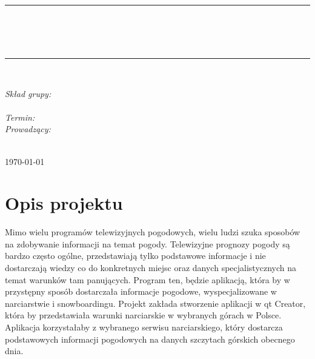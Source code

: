 \documentclass[10pt, a4paper]{article}
\begin{document}
\def\tablename{Tabela}	

\begin{titlepage}
	\begin{center}
		\textsc{\LARGE \formakursu}\\[1cm]		
		\textsc{\Large \kurs}\\[0.5cm]		
		\rule{\textwidth}{0.08cm}\\[0.4cm]
		{\huge \bfseries \doctype}\\[1cm]
		{\huge \bfseries \projectname}\\[0.5cm]
	
		\rule{\textwidth}{0.08cm}\\[1cm]
		
		\begin{flushright} \large
		\emph{Skład grupy:}\\
		\osobaA\\

		
		\emph{Termin: }\termin\\[0.4cm]

		\emph{Prowadzący:} \\
		\prowadzacy \\
		
		\end{flushright}
		
		\vfill
		
		{\large \today}
	\end{center}	
\end{titlepage}

\newpage
\tableofcontents
\newpage

\section{Opis projektu}
\label{sec:OpisProjektu}
Mimo wielu programów telewizyjnych pogodowych, wielu ludzi szuka sposobów na zdobywanie informacji na temat pogody. Telewizyjne prognozy pogody są bardzo często ogólne, przedstawiają tylko podstawowe informacje i nie dostarczają wiedzy co do konkretnych miejsc oraz danych specjalistycznych na temat warunków tam panujących. Program ten, będzie aplikacją, która by w przystępny sposób dostarczała informacje pogodowe, wyspecjalizowane w narciarstwie i snowboardingu. 
Projekt zakłada stworzenie aplikacji w qt Creator, która by przedstawiała warunki narciarskie w wybranych górach w Polsce. Aplikacja korzystałaby z wybranego serwisu narciarskiego, który dostarcza podstawowych informacji pogodowych na danych szczytach górskich obecnego dnia.
\end{document}
